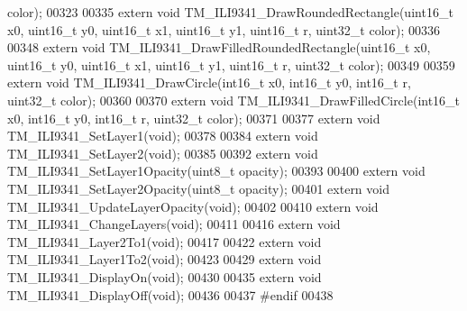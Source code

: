 \begin{DoxyCode}
      color);
00323 
00335 \textcolor{keyword}{extern} \textcolor{keywordtype}{void} TM\_ILI9341\_DrawRoundedRectangle(uint16\_t x0, uint16\_t y0, uint16\_t x1, uint16\_t y1, uint16\_t r,
       uint32\_t color);
00336 
00348 \textcolor{keyword}{extern} \textcolor{keywordtype}{void} TM\_ILI9341\_DrawFilledRoundedRectangle(uint16\_t x0, uint16\_t y0, uint16\_t x1, uint16\_t y1, 
      uint16\_t r, uint32\_t color);
00349 
00359 \textcolor{keyword}{extern} \textcolor{keywordtype}{void} TM\_ILI9341\_DrawCircle(int16\_t x0, int16\_t y0, int16\_t r, uint32\_t color);
00360 
00370 \textcolor{keyword}{extern} \textcolor{keywordtype}{void} TM\_ILI9341\_DrawFilledCircle(int16\_t x0, int16\_t y0, int16\_t r, uint32\_t color);
00371 
00377 \textcolor{keyword}{extern} \textcolor{keywordtype}{void} TM\_ILI9341\_SetLayer1(\textcolor{keywordtype}{void});
00378 
00384 \textcolor{keyword}{extern} \textcolor{keywordtype}{void} TM\_ILI9341\_SetLayer2(\textcolor{keywordtype}{void});
00385 
00392 \textcolor{keyword}{extern} \textcolor{keywordtype}{void} TM\_ILI9341\_SetLayer1Opacity(uint8\_t opacity);
00393 
00400 \textcolor{keyword}{extern} \textcolor{keywordtype}{void} TM\_ILI9341\_SetLayer2Opacity(uint8\_t opacity);
00401 \textcolor{keyword}{extern} \textcolor{keywordtype}{void} TM\_ILI9341\_UpdateLayerOpacity(\textcolor{keywordtype}{void});
00402 
00410 \textcolor{keyword}{extern} \textcolor{keywordtype}{void} TM\_ILI9341\_ChangeLayers(\textcolor{keywordtype}{void});
00411 
00416 \textcolor{keyword}{extern} \textcolor{keywordtype}{void} TM\_ILI9341\_Layer2To1(\textcolor{keywordtype}{void});
00417 
00422 \textcolor{keyword}{extern} \textcolor{keywordtype}{void} TM\_ILI9341\_Layer1To2(\textcolor{keywordtype}{void});
00423 
00429 \textcolor{keyword}{extern} \textcolor{keywordtype}{void} TM\_ILI9341\_DisplayOn(\textcolor{keywordtype}{void});
00430 
00435 \textcolor{keyword}{extern} \textcolor{keywordtype}{void} TM\_ILI9341\_DisplayOff(\textcolor{keywordtype}{void});
00436 
00437 \textcolor{preprocessor}{#endif}
00438 
\end{DoxyCode}
